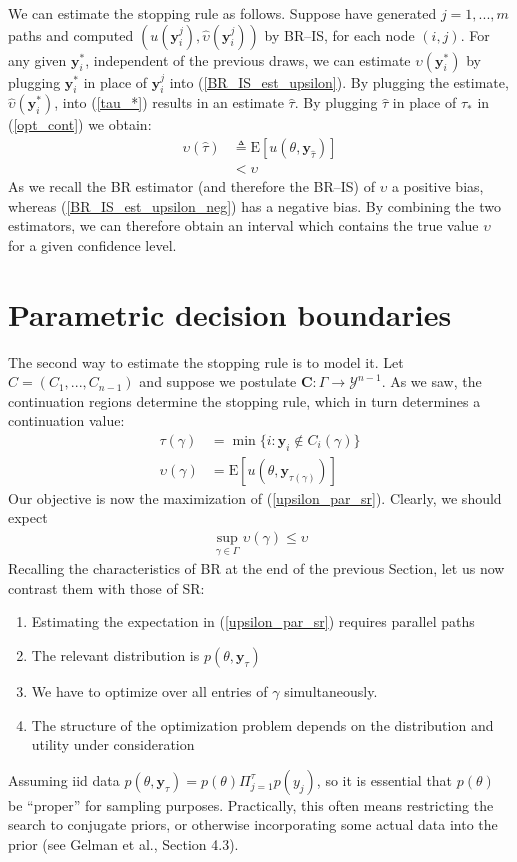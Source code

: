 \documentclass[11pt]{article}
\begin{document}
We can estimate the stopping rule as follows. Suppose have generated
$j=1,...,m$ paths and computed
$(u(\mathbf{y}_i^j),\hat\upsilon(\mathbf{y}_i^j))$ by BR--IS, for
each node $(i,j)$. For any given $\mathbf{y}_i^*$, independent of
the previous draws, we can estimate $\upsilon(\mathbf{y}_i^*)$ by
plugging $\mathbf{y}_i^*$ in place of $\mathbf{y}_i^j$ into
(\ref{BR_IS_est_upsilon}). By plugging the estimate,
$\hat\upsilon(\mathbf{y}_i^*)$, into (\ref{tau_*}) results in an
estimate $\hat\tau$. By plugging $\hat\tau$ in place of $\tau_*$ in
(\ref{opt_cont}) we obtain:
\begin{align}\label{BR_IS_est_upsilon_neg}
\upsilon(\hat \tau)&\triangleq
\mathrm{E}[u(\theta,\mathbf{y}_{\hat\tau})]\\&< \upsilon
\end{align}As we recall the BR estimator (and therefore the
BR--IS) of $\upsilon$ a positive bias, whereas
(\ref{BR_IS_est_upsilon_neg}) has a negative bias. By combining the
two estimators, we can therefore obtain an interval which contains
the true value $\upsilon$ for a given confidence level.
\section{Parametric decision boundaries}
The second way to estimate the stopping rule is to model it. Let
$C=(C_1,...,C_{n-1})$ and suppose we postulate $\mathbf{C}:\Gamma
\rightarrow\boldsymbol{\mathcal{Y}}^{n-1}$. As we saw, the
continuation regions determine the stopping rule, which in turn
determines a continuation value:\begin{align}
\tau(\gamma)&=\min\{i: \mathbf{y}_i \notin C_i(\gamma)\}\\
\label{upsilon_par_sr} \upsilon(\gamma)&=
\mathrm{E}[u(\theta,\mathbf{y}_{\tau(\gamma)})]
\end{align}Our objective is now the maximization of
(\ref{upsilon_par_sr}). Clearly, we should expect
 \begin{align}\label{sup_upsilon_par_sr}
\sup_{\gamma\in\Gamma} \upsilon(\gamma)\leq \upsilon
\end{align}
Recalling the characteristics of BR at the end of the previous
Section, let us now contrast them with those of SR:
\begin{enumerate}
\item Estimating the expectation in (\ref{upsilon_par_sr}) requires parallel
paths
\item The relevant distribution is $p(\theta,\mathbf{y}_{\tau})$
\item We have to optimize over all entries of $\gamma$ simultaneously.
\item The structure of the optimization problem depends on the
distribution and utility under consideration
\end{enumerate}Assuming iid data
$p(\theta,\mathbf{y}_\tau)=p(\theta)\Pi_{j=1}^{\tau}p(y_j)$, so it
is essential that $p(\theta)$ be ``proper'' for sampling purposes.
Practically, this often means restricting the search to conjugate
priors, or otherwise incorporating some actual data into the prior
(see Gelman et al., Section 4.3).
\end{document}
